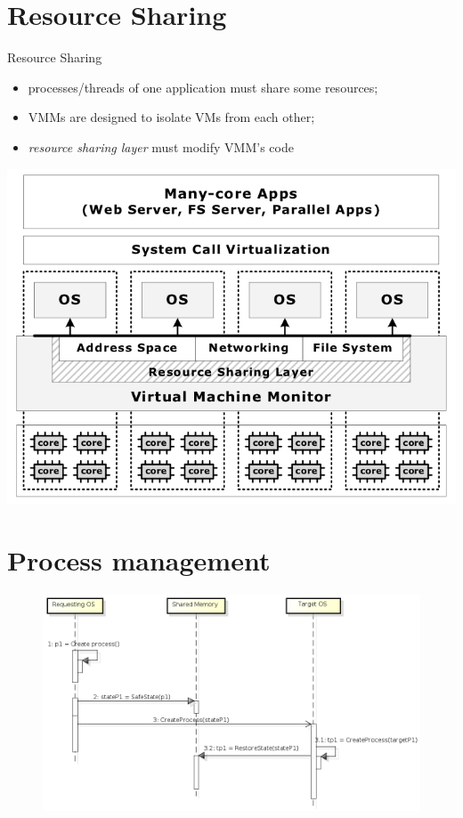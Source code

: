 \documentclass{beamer}
\begin{document}
\section{Resource Sharing}

\begin{frame}{Resource Sharing}
  \begin{itemize}
    \item processes/threads of one application must share some
      resources;
    \item VMMs are designed to isolate VMs from each other;
    \item \emph{resource sharing layer} must modify VMM's code
  \end{itemize}
  \begin{center}
    \includegraphics[scale=0.3]{overview.png}
  \end{center}
\end{frame}


\section{Process management}

	\begin{frame}[plain]
		\begin{figure} [H]
			\centering
			\includegraphics[scale=0.46]{img/cerberus-process-creation}
		\end{figure}
	\end{frame}
\end{document}
